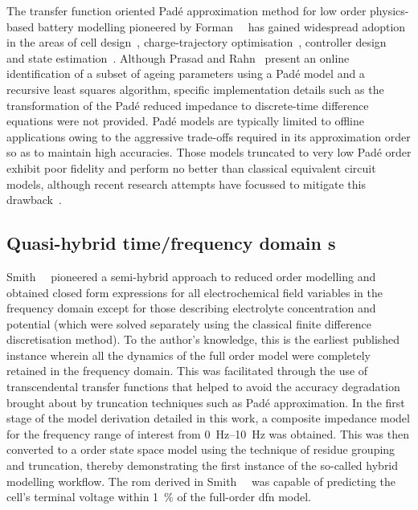 The     transfer     function     oriented    Padé     approximation     method
for    low    order    physics-based     battery    modelling    pioneered    by
Forman~\etal{}~\cite{Forman2011a}    has   gained    widespread   adoption    in
the    areas     of    cell     design~\cite{Marcicki2013},    charge-trajectory
optimisation~\cite{Bashash2010},    controller    design~\cite{Perez2015}    and
state    estimation~\cite{Marcicki2013,Moura2012}.     Although    Prasad    and
Rahn~\cite{Prasad2013} present  an online identification  of a subset  of ageing
parameters  using  a  Padé  model  and a  recursive  least  squares  algorithm,
specific  implementation  details  such  as  the  transformation  of  the  Padé
reduced  impedance  to discrete-time  difference  equations  were not  provided.
Padé  models  are  typically  limited  to offline  applications  owing  to  the
aggressive  trade-offs required  in its  approximation order  so as  to maintain
high  accuracies.  Those  models  truncated  to very  low  Padé  order  exhibit
poor  fidelity  and   perform  no  better  than   classical  equivalent  circuit
models,  although  recent  research  attempts have  focussed  to  mitigate  this
drawback~\cite{Yuan2017a,Yuan2017}.


\subsection{Quasi-hybrid time/frequency domain s}

Smith~\etal{}~\cite{Smith2007} pioneered a semi-hybrid approach to reduced order
modelling and  obtained closed  form expressions  for all  electrochemical field
variables  in  the frequency  domain  except  for those  describing  electrolyte
concentration and  potential (which were  solved separately using  the classical
finite difference discretisation method). To the author's knowledge, this is the
earliest published  instance wherein all  the dynamics  of the full  order model
were completely retained  in the frequency domain. This  was facilitated through
the use of  transcendental transfer functions that helped to  avoid the accuracy
degradation brought about by truncation  techniques such as Padé approximation.
In the first  stage of the model  derivation detailed in this  work, a composite
impedance model for the frequency range of interest from \SIrange{0}{10}{\hertz}
was  obtained.  This was  then  converted  to  a   order  state
space  model using  the technique  of residue  grouping and  truncation, thereby
demonstrating the first instance of the so-called hybrid modelling workflow. The
\gls{rom} derived  in Smith~\etal{}~\cite{Smith2007}  was capable  of predicting
the cell's terminal voltage within  \SI{1}{\percent} of the full-order \gls{dfn}
model.


